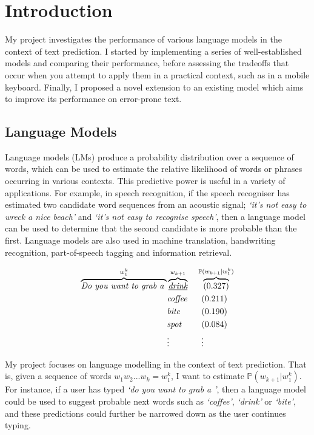 \documentclass[a4paper, 12pt]{report}
\newcommand{\tit}[1]{\textit{#1}}
\begin{document}
\tableofcontents


\pagestyle{headings}

\chapter{Introduction}

My project investigates the performance of various language models in the context of text prediction. I started by implementing a series of well-established models and comparing their performance, before assessing the tradeoffs that occur when you attempt to apply them in a practical context, such as in a mobile keyboard. Finally, I proposed a novel extension to an existing model which aims to improve its performance on error-prone text.

\section{Language Models}

Language models (LMs) produce a probability distribution over a sequence of words, which can be used to estimate the relative likelihood of words or phrases occurring in various contexts. This predictive power is useful in a variety of applications. For example, in speech recognition, if the speech recogniser has estimated two candidate word sequences from an acoustic signal; \tit{`it's not easy to wreck a nice beach'} and \tit{`it's not easy to recognise speech'}, then a language model can be used to determine that the second candidate is more probable than the first. Language models are also used in machine translation, handwriting recognition, part-of-speech tagging and information retrieval.

\begin{alignat*}{2}
	\overbrace{\tit{Do you want to grab a }}^{w_1^k}&\overbrace{\underline{\tit{drink}}}^{w_{k+1}} &&\hspace{0.5mm}\overbrace{(0.327)}^{\mathbb{P}(w_{k + 1} | w_1^k)} \\
	&\tit{coffee} &&\ \ (0.211) \\
	&\tit{bite} &&\ \ (0.190) \\
	&\tit{spot} &&\ \ (0.084) \\
	&\vdots &&\ \ \vdots
\end{alignat*}

My project focuses on language modelling in the context of text prediction. That is, given a sequence of words $w_1w_2...w_k = w_1^k$, I want to estimate $\mathbb{P}(w_{k + 1} | w_1^k)$. For instance, if a user has typed \tit{`do you want to grab a '}, then a language model could be used to suggest probable next words such as \tit{`coffee'}, \tit{`drink'} or \tit{`bite'}, and these predictions could further be narrowed down as the user continues typing.
\end{document}
